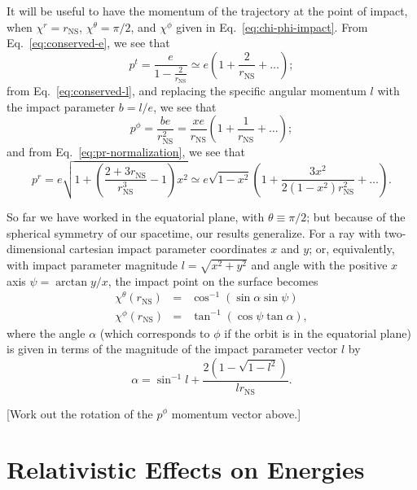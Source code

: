 \documentclass[modern]{aastex631}
\newcommand{\rNS}{r_\mathrm{NS}}
\begin{document}
It will be useful to have the momentum of the trajectory at the point of impact,
when $\chi^r = \rNS$, $\chi^\theta = \pi/2$, and $\chi^\phi$ given in Eq.\
\eqref{eq:chi-phi-impact}.  From Eq.\ \eqref{eq:conserved-e}, we see that 
\begin{equation}
    p^t = \frac{e}{1 - \frac{2}{\rNS}} \simeq e \left( 1 + \frac{2}{\rNS} + \ldots \right);
\end{equation}
from Eq.\ \eqref{eq:conserved-l}, and replacing the specific angular momentum
$l$ with the impact parameter $b = l/e$, we see that 
\begin{equation}
    p^\phi = \frac{b e}{\rNS^2} = \frac{x e}{\rNS} \left( 1 + \frac{1}{\rNS} + \ldots \right);
\end{equation}
and from Eq.\ \eqref{eq:pr-normalization}, we see that 
\begin{equation}
    p^r = e \sqrt{1 + \left( \frac{2 + 3 \rNS}{\rNS^3} - 1 \right) x^2} \simeq e \sqrt{1-x^2} \left( 1 + \frac{3 x^2}{2 \left( 1 - x^2 \right) \rNS^2} + \ldots \right).
\end{equation}

So far we have worked in the equatorial plane, with $\theta \equiv \pi/2$; but
because of the spherical symmetry of our spacetime, our results generalize.  For
a ray with two-dimensional cartesian impact parameter coordinates $x$ and $y$;
or, equivalently, with impact parameter magnitude $l = \sqrt{x^2 + y^2}$ and
angle with the positive $x$ axis $\psi = \arctan y/x$, the impact point on the
surface becomes 
\begin{eqnarray}
    \chi^\theta \left( \rNS \right) & = & \cos^{-1} \left( \sin \alpha \sin \psi \right)  \\
    \chi^\phi \left( \rNS \right) & = & \tan^{-1} \left( \cos \psi \tan \alpha \right),
\end{eqnarray}
where the angle $\alpha$ (which corresponds to $\phi$ if the orbit is in the
equatorial plane) is given in terms of the magnitude of the impact parameter
vector $l$ by
\begin{equation}
    \alpha = \sin^{-1} l + \frac{2 \left( 1 - \sqrt{1 - l^2} \right)}{l \rNS}.
\end{equation}

[Work out the rotation of the $p^\phi$ momentum vector above.]

\section{Relativistic Effects on Energies}
\label{sec:relativistic}
\end{document}
